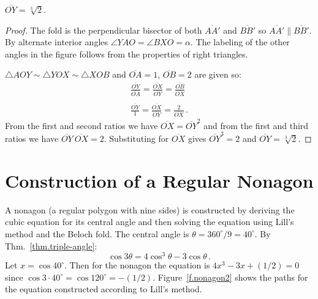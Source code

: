 \begin{theorem}
$\overline{OY}=\sqrt[3]{2}$.
\end{theorem}
\begin{proof}
The fold is the perpendicular bisector of both $\overline{AA'}$ and $\overline{BB'}$ so $\overline{AA'}\parallel\overline{BB'}$. By alternate interior angles $\angle YAO =\angle BXO=\alpha$. The labeling of the other angles in the figure follows from the properties of right triangles.

\newpage

$\triangle AOY\sim \triangle YOX \sim \triangle XOB$ and $\overline{OA}=1$, $\overline{OB}=2$ are given so:
\[
\begin{array}{l}
\displaystyle\frac{\overline{OY}}{\overline{OA}}=\displaystyle\frac{\overline{OX}}{\overline{OY}}=\displaystyle\frac{\overline{OB}}{\overline{OX}}\\
\\
\displaystyle\frac{\overline{OY}}{1}=\displaystyle\frac{\overline{OX}}{\overline{OY}}=\displaystyle\frac{2}{\overline{OX}}\,.
\end{array}
\]
From the first and second ratios we have $\overline{OX}=\overline{OY}^2$ and from the first and third ratios we have $\overline{OY}\:\overline{OX}=2$.
Substituting for $\overline{OX}$ gives $\overline{OY}^3=2$ and
$\overline{OY}=\sqrt[3]{2}$.
\end{proof}

\vspace{-5ex}

\section{Construction of a Regular Nonagon}\label{s.nonagon}


A nonagon (a regular polygon with nine sides) is constructed by deriving the cubic equation for its central angle and then solving the equation using Lill's method and the Beloch fold. The central angle is $\theta=360^\circ/9=40^\circ$. By Thm.~\ref{thm.triple-angle}:
\[
\cos 3\theta=4\cos^3 \theta -3\cos\theta\,.
\]
Let $x=\cos 40^{\circ}$. Then for the nonagon the equation is $4x^3-3x+(1/2)=0$ since $\cos 3\cdot 40^\circ=\cos 120^\circ=-(1/2)$. Figure~\ref{f.nonagon2} shows the paths for the equation constructed according to Lill's method.

